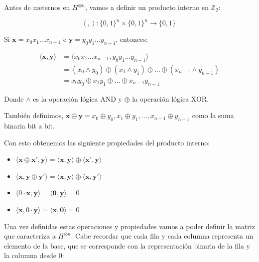  Antes de meternos en $H^{\otimes n}$, vamos a definir un producto interno en $\mathbb{Z}_{2}$:\newline

 \begin{equation*}
     \langle\:,\:\rangle\::\{0,1\}^{n} \times \{0,1\}^{n} \rightarrow \{0,1\}\end{equation*}

 Si $\mathbf{x}=x_{0}x_{1}...x_{n-1}$ e $\mathbf{y}=y_{0}y_{1}...y_{n-1}$, entonces:

 \begin{equation*}
     \begin{split}
     \langle\mathbf{x},\mathbf{y}\rangle &= \langle x_{0}x_{1}...x_{n-1},y_{0}y_{1}...y_{n-1}\rangle \\ &= (x_{0}\land y_{0})\oplus(x_{1}\land y_{1})\oplus...\oplus(x_{n-1}\land y_{n-1}) \\ &= x_{0}y_{0}\oplus x_{1}y_{1}\oplus ... \oplus x_{n-1}y_{n-1}
     \end{split}
 \end{equation*}

 Donde $\land$ es la operación lógica AND y $\oplus$ la operación lógica XOR.\newline

 También definimos, $\mathbf{x}\oplus\mathbf{y}=x_{0}\oplus y_{0},x_{1}\oplus y_{1},...,x_{n-1}\oplus y_{n-1}$ como la suma binaria bit a bit.\newline

 Con esto obtenemos las siguiente propiedades del producto interno:

 \begin{itemize}
     \item $\langle \mathbf{x} \oplus \mathbf{x}',\mathbf{y}\rangle=\langle \mathbf{x},\mathbf{y}\rangle \oplus \langle \mathbf{x}',\mathbf{y}\rangle$

     \item $\langle \mathbf{x},\mathbf{y} \oplus \mathbf{y}'\rangle=\langle \mathbf{x},\mathbf{y}\rangle \oplus \langle \mathbf{x},\mathbf{y}'\rangle$

     \item $\langle 0\cdot \mathbf{x},\mathbf{y}\rangle=\langle\mathbf{0},\mathbf{y}\rangle=0$

     \item $\langle \mathbf{x}, 0 \cdot \mathbf{y}\rangle=\langle \mathbf{x},\mathbf{0}\rangle=0$
 \end{itemize}

 Una vez definidas estas operaciones y propiedades vamos a poder definir la matriz que caracteriza a $H^{\otimes n}$. Cabe recordar que cada fila y cada columna representa un elemento de la base, que se corresponde con la representación binaria de la fila y la columna desde 0:
 
